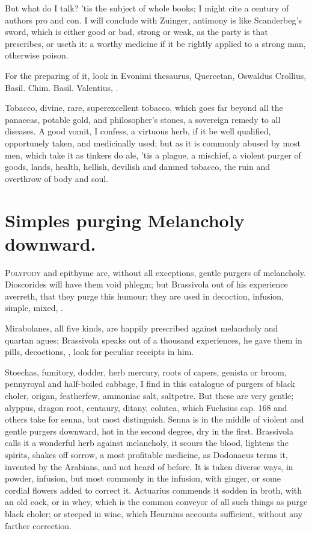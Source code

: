 {But what do I talk? 'tis the subject of whole books; I might cite a
century of authors pro and con. I will conclude with Zuinger,
antimony is like Scanderbeg's sword, which is either good or bad,
strong or weak, as the party is that prescribes, or useth it: a worthy
medicine if it be rightly applied to a strong man, otherwise poison.

For the preparing of it, look in Evonimi thesaurus, Quercetan, Oswaldus
Crollius, Basil. Chim. Basil. Valentius, \etc{}.

Tobacco, divine, rare, superexcellent tobacco, which goes far beyond
all the panaceas, potable gold, and philosopher's stones, a sovereign
remedy to all diseases. A good vomit, I confess, a virtuous herb, if it
be well qualified, opportunely taken, and medicinally used; but as it
is commonly abused by most men, which take it as tinkers do ale, 'tis a
plague, a mischief, a violent purger of goods, lands, health, hellish,
devilish and damned tobacco, the ruin and overthrow of body and soul.

\section{Simples purging Melancholy downward.}

\lettrine{P}{olypody} and epithyme are, without all exceptions, gentle purgers of
melancholy. Dioscorides will have them void phlegm; but Brassivola out
of his experience averreth, that they purge this humour; they are used
in decoction, infusion, \etc{} simple, mixed, \etc{}.

Mirabolanes, all five kinds, are happily prescribed against
melancholy and quartan agues; Brassivola speaks out of a thousand
experiences, he gave them in pills, decoctions, \etc{}, look for peculiar
receipts in him.

Stoechas, fumitory, dodder, herb mercury, roots of capers, genista or
broom, pennyroyal and half-boiled cabbage, I find in this catalogue of
purgers of black choler, origan, featherfew, ammoniac salt,
saltpetre. But these are very gentle; alyppus, dragon root, centaury,
ditany, colutea, which Fuchsius cap. 168 and others take for senna, but
most distinguish. Senna is in the middle of violent and gentle purgers
downward, hot in the second degree, dry in the first. Brassivola calls
it a wonderful herb against melancholy, it scours the blood,
lightens the spirits, shakes off sorrow, a most profitable medicine, as
 Dodonaeus terms it, invented by the Arabians, and not heard of
before. It is taken diverse ways, in powder, infusion, but most
commonly in the infusion, with ginger, or some cordial flowers added to
correct it. Actuarius commends it sodden in broth, with an old cock, or
in whey, which is the common conveyor of all such things as purge black
choler; or steeped in wine, which Heurnius accounts sufficient, without
any farther correction.

}

